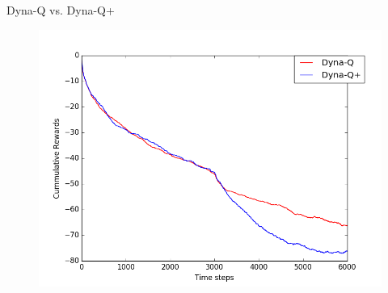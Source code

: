 \documentclass[12pt]{article}
\newenvironment{problem}[2][\large Problem]{\begin{trivlist}
\item[\hskip \labelsep {\bfseries #1}\hskip \labelsep {\bfseries #2.}]}{\end{trivlist}}
\begin{document}
\begin{problem} {2} Dyna-Q vs. Dyna-Q+\\
\begin{figure}[h]
	\centering
	\includegraphics[width = 0.9\linewidth]{prob2_10agents.png}
\end{figure}	
\end{problem}
\end{document}
